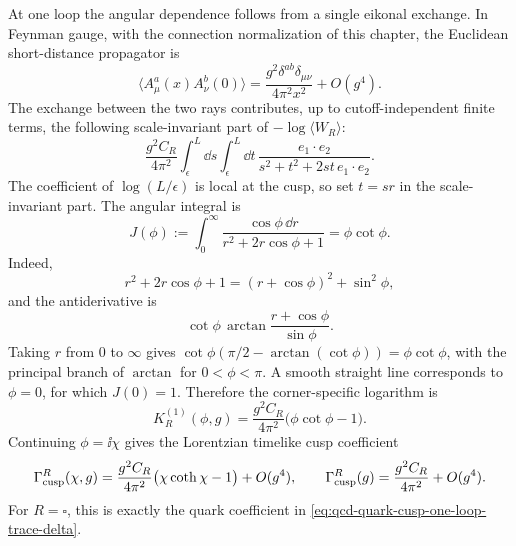 At one loop the angular dependence follows from a single eikonal exchange.
In Feynman gauge, with the connection normalization of this chapter, the
Euclidean short-distance propagator is
\[
  \langle A_\mu^a(x)A_\nu^b(0)\rangle
  =
  \frac{g^2\delta^{ab}\delta_{\mu\nu}}{4\pi^2x^2}+O(g^4).
\]
The exchange between the two rays contributes, up to cutoff-independent
finite terms, the following scale-invariant part of
\(-\log\langle W_R\rangle\):
\[
  \frac{g^2C_R}{4\pi^2}
  \int_\epsilon^L\dd s\int_\epsilon^L\dd t\,
  \frac{e_1\cdot e_2}
  {s^2+t^2+2st\,e_1\cdot e_2}.
\]
The coefficient of \(\log(L/\epsilon)\) is local at the cusp, so set
\(t=sr\) in the scale-invariant part.  The angular integral is
\begin{equation}
  J(\phi)
  :=
  \int_0^\infty
  \frac{\cos\phi\,\dd r}
  {r^2+2r\cos\phi+1}
  =
  \phi\cot\phi .
  \label{eq:qcd-cusp-angular-integral}
\end{equation}
Indeed,
\[
  r^2+2r\cos\phi+1
  =
  (r+\cos\phi)^2+\sin^2\phi,
\]
and the antiderivative is
\[
  \cot\phi\,
  \arctan\frac{r+\cos\phi}{\sin\phi}.
\]
Taking \(r\) from \(0\) to \(\infty\) gives
\(\cot\phi(\pi/2-\arctan(\cot\phi))=\phi\cot\phi\), with the principal branch
of \(\arctan\) for \(0<\phi<\pi\).  A smooth straight line corresponds to
\(\phi=0\), for which \(J(0)=1\).  Therefore the corner-specific logarithm is
\begin{equation}
  K_R^{(1)}(\phi,g)
  =
  \frac{g^2C_R}{4\pi^2}
  \bigl(\phi\cot\phi-1\bigr).
  \label{eq:qcd-euclidean-cusp-one-loop}
\end{equation}
Continuing \(\phi=\ii\chi\) gives the Lorentzian timelike cusp coefficient
\begin{equation}
  \Gamma_{\rm cusp}^R(\chi,g)
  =
  \frac{g^2C_R}{4\pi^2}
  \bigl(\chi\coth\chi-1\bigr)+O(g^4),
  \qquad
  \Gamma_{\rm cusp}^R(g)
  =
  \frac{g^2C_R}{4\pi^2}+O(g^4).
  \label{eq:qcd-lorentzian-cusp-one-loop}
\end{equation}
For \(R=\square\), this is exactly the quark coefficient in
\eqref{eq:qcd-quark-cusp-one-loop-trace-delta}.

